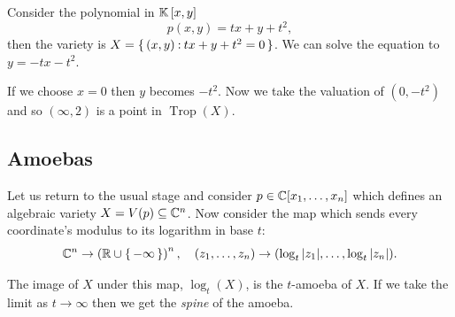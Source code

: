 \documentclass[12pt]{memoir}
\DeclareMathOperator{\Trop}{Trop}
\begin{document}
\begin{Ex}
    Consider the polynomial in $\mathbb{K}\left\lbrack x,y\right\rbrack$ 
    $$p(x,y)=tx+y+t^2,$$
    then the variety is $X=\{\,(x,y)\mathbin{:} tx+y+t^2=0\,\}$. We can solve the equation to $y=-tx-t^2$.\par 
    If we choose $x=0$ then $y$ becomes $-t^2$. Now we take the valuation of $(0,-t^2)$ and so $(\infty,2)$ is a point in $\Trop(X)$.
\end{Ex}

\subsection{Amoebas}

Let us return to the usual stage and consider $p\in\mathbb{C}[x_1,\dots,x_n]$ which defines an algebraic variety $X=V(p)\subseteq\mathbb{C}^n$. Now consider the map which sends every coordinate's modulus to its logarithm in base $t$: 
$$\mathbb{C}^n\to\left(\mathbb{R}\cup\{\,-\infty\,\}\right)^n,\quad (z_1,\dots,z_n)\to(\log_t|z_1|,\dots,\log_t|z_n|).$$


The image of $X$ under this map, $\log_t(X)$, is the $t$-amoeba of $X$. If we take the limit as $t\to\infty$ then we get the \emph{spine} of the amoeba. 
\end{document}
